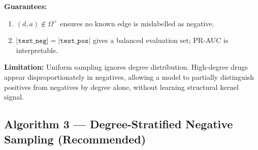\documentclass[12pt, a4paper]{article}
\newcommand{\posset}{\Omega^{+}}                    %
\begin{document}
\noindent\textbf{Guarantees:}
\begin{enumerate}
  \item $(d,a)\notin\posset$ ensures no known edge is mislabelled as negative.
  \item $|\texttt{test\_neg}|=|\texttt{test\_pos}|$ gives a balanced evaluation
        set; PR-AUC is interpretable.
\end{enumerate}
\textbf{Limitation:} Uniform sampling ignores degree distribution.
High-degree drugs appear disproportionately in negatives, allowing a model to
partially distinguish positives from negatives by degree alone, without
learning structural kernel signal.

\subsection*{Algorithm 3 — Degree-Stratified Negative Sampling (Recommended)}
\end{document}
